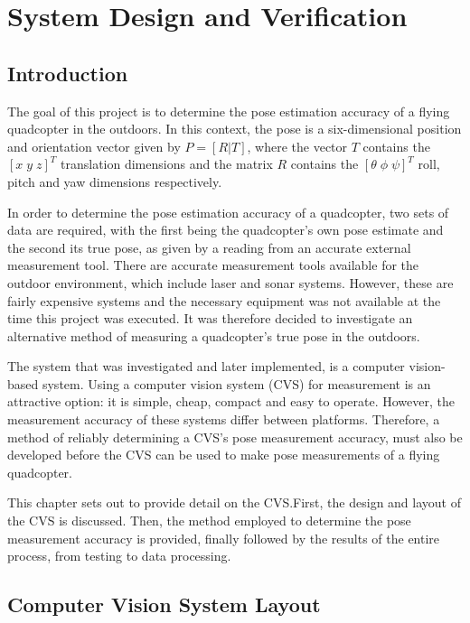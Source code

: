 \chapter{System Design and Verification}

\section{Introduction}

The goal of this project is to determine the pose estimation accuracy of a flying quadcopter in the outdoors. In this context, the pose is a six-dimensional position and orientation vector given by $P = [R | T]$, where the vector $T$ contains the $[x\;y\;z]^T$ translation dimensions and the matrix $R$ contains the $[\theta\;\phi\;\psi]^T$ roll, pitch and yaw dimensions respectively. 

In order to determine the pose estimation accuracy of a quadcopter, two sets of data are required, with the first being the quadcopter's own pose estimate and the second its true pose, as given by a reading from an accurate external measurement tool. There are accurate measurement tools available for the outdoor environment, which include laser and sonar systems. However, these are fairly expensive systems and the necessary equipment was not available at the time this project was executed. It was therefore decided to investigate an alternative method of measuring a quadcopter's true pose in the outdoors.

The system that was investigated and later implemented, is a computer vision-based system. Using a computer vision system (CVS) for measurement is an attractive option: it is simple, cheap, compact and easy to operate. However, the measurement accuracy of these systems differ between platforms. Therefore, a method of reliably determining a CVS's pose measurement accuracy, must also be developed before the CVS can be used to make pose measurements of a flying quadcopter. 

This chapter sets out to provide detail on the CVS.\@ First, the design and layout of the CVS is discussed. Then, the method employed to determine the pose measurement accuracy is provided, finally followed by the results of the entire process, from testing to data processing.

\section{Computer Vision System Layout}
\label{sec:chap3-cvs-layout}

